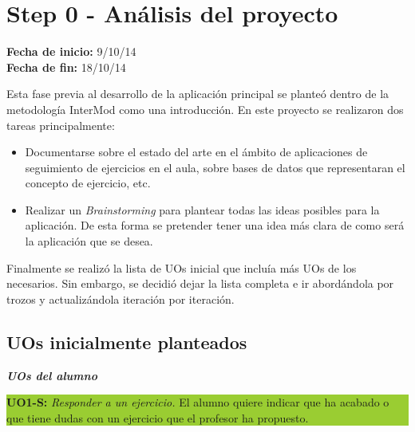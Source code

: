 
\section{Step 0 - Análisis del proyecto}
\label{step0}

\begin{flushleft}
\textbf{Fecha de inicio:} 9/10/14\\
\textbf{Fecha de fin:} 18/10/14\\
\end{flushleft}

Esta fase previa al desarrollo de la aplicación principal se planteó dentro de la metodología InterMod como una introducción. En este proyecto se realizaron dos tareas principalmente:

\begin{itemize}
\item Documentarse sobre el estado del arte en el ámbito de aplicaciones de seguimiento de ejercicios en el aula, sobre bases de datos que representaran el concepto de ejercicio, etc.
\item Realizar un \textit{Brainstorming} para plantear todas las ideas posibles para la aplicación. De esta forma se pretender tener una idea más clara de como será la aplicación que se desea.
\end{itemize}

Finalmente se realizó la lista de UOs inicial que incluía más UOs de los necesarios. Sin embargo, se decidió dejar la lista completa e ir abordándola por trozos y actualizándola iteración por iteración.\\

\subsection{UOs inicialmente planteados}
\label{step0:uos}

\textbf\textit{\large UOs del alumno}\\

\colorbox{YellowGreen}{\parbox[c]{1.0\textwidth}{
	\textbf{UO1-S:} \textit{Responder a un ejercicio.} El alumno quiere indicar que ha acabado o que tiene dudas con 			un ejercicio que el profesor ha propuesto.\\
}}\\

